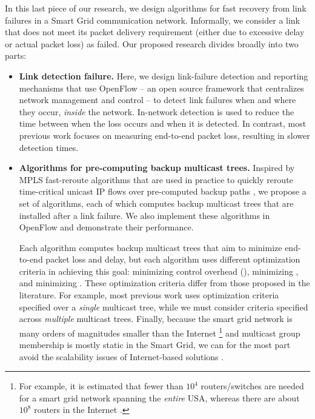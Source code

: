 In this last piece of our research, we design algorithms for fast recovery from link failures in a Smart Grid communication network. 
Informally, we consider a link that does not meet its packet delivery requirement (either due to excessive delay or actual packet loss) as failed.  Our proposed research divides broadly into two parts:
\begin{itemize}
	
	\item {\bf Link detection failure.} 
		Here, we design link-failure detection and reporting mechanisms that use OpenFlow \cite{OpenFlow08} -- an open source framework that centralizes network management and control -- 
		to detect link failures when and where they occur, \emph{inside} the network.  In-network detection is used to reduce the time between when the loss occurs and when it is detected. 
		In contrast, most previous work \cite{Almes99,Caceres99,Friedl09} focuses on measuring end-to-end packet loss, resulting in slower detection times. 

	\item {\bf Algorithms for pre-computing backup multicast trees.} 
		Inspired by MPLS fast-reroute algorithms that are used in practice to quickly reroute time-critical unicast IP flows over pre-computed backup paths \cite{Cui04,Fei01,Medard99,Pointurier02,Wu97}, 
		we propose a set of algorithms, each of which computes backup multicast trees that are installed after a link failure. We also implement these algorithms in OpenFlow and demonstrate their performance.
		
		Each algorithm computes backup multicast trees that aim to minimize end-to-end packet loss and delay, but each algorithm uses different optimization criteria in achieving this goal: 
		minimizing control overhead (\mcs), minimizing ,
   		and minimizing .  These optimization criteria differ from those proposed in the literature.
		For example, most previous work \cite{Cui04,Fei01,Medard99,Pointurier02,Wu97} uses optimization criteria specified over a \emph{single} multicast tree, while we must consider 
		criteria specified across \emph{multiple} multicast trees. Finally, because the smart grid network is many orders of magnitudes smaller than the Internet
		\footnote{For example, it is estimated that fewer than $10^4$ routers/switches are needed for a smart grid network spanning the \emph{entire} USA, whereas there are about $10^8$ routers in the Internet \cite{Bakken11}.} 
		and multicast group membership is mostly static in the Smart Grid, we can for the most part avoid the scalability issues of Internet-based solutions \cite{Cui04,Fei01,Medard99,Pointurier02,Wu97}.

\end{itemize}


